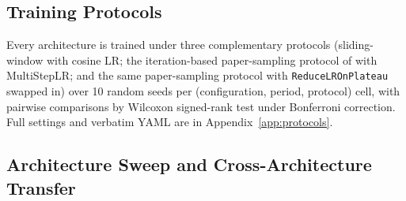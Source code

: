 \documentclass[11pt,a4paper]{article}
\begin{document}
\begin{table}[h]
  \caption{Datasets and evaluation parameters. The paper-sample protocol enforces the in-sample constraint $L_h \cdot H$~\citep[Appendix~D]{oreshkin2020nbeats} on the trailing window of each series, with $L_h = 1.5$ for Yearly/Quarterly and $L_h = 10$ otherwise.}
  \label{tab:datasets}
  \centering
\end{table}

\subsection{Training Protocols}

Every architecture is trained under three complementary protocols (sliding-window with cosine LR; the iteration-based paper-sampling protocol of \citet{oreshkin2020nbeats} with MultiStepLR; and the same paper-sampling protocol with \texttt{ReduceLROnPlateau} swapped in) over 10 random seeds per (configuration, period, protocol) cell, with pairwise comparisons by Wilcoxon signed-rank test under Bonferroni correction. Full settings and verbatim YAML are in Appendix~\ref{app:protocols}.

\subsection{Architecture Sweep and Cross-Architecture Transfer}
\end{document}
